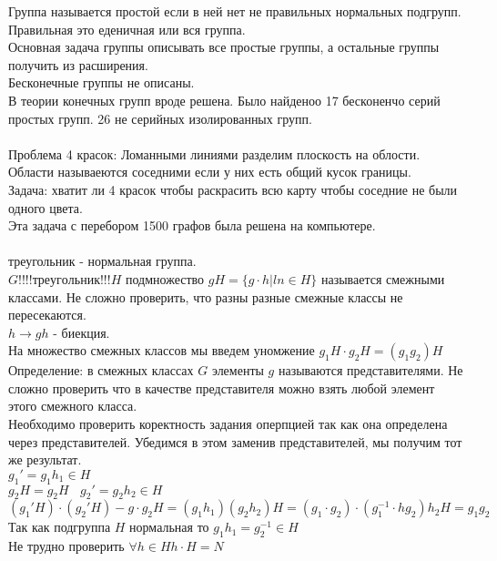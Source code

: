 Группа называется простой если в ней нет не правильных нормальных подгрупп.\\
Правильная это еденичная или вся группа.\\

Основная задача группы описывать все простые группы, а остальные группы получить
из расширения.\\

Бесконечные группы не описаны.\\

В теории конечных групп вроде решена. Было найденоо 17 бесконенчо серий простых
групп. 26 не серийных изолированных групп.\\\\

Проблема 4 красок: Ломанными линиями разделим плоскость на облости. Области
называеются соседними если у них есть общий кусок границы.\\
Задача: хватит ли 4 красок чтобы раскрасить всю карту чтобы соседние не были
одного цвета.\\
Эта задача с перебором 1500 графов была решена на компьютере.\\

\\
треугольник - нормальная группа.\\
$G 	!!!!треугольник!!! H$ подмножество $gH = \{g\cdot h | ln \in H\}$ называется
смежными классами. Не сложно проверить, что разны разные смежные классы не
пересекаются.\\
$h \to gh$ - биекция.\\
На множество смежных классов мы введем уномжение $g_1H\cdot g_2H = (g_1g_2)H$\\

Определение: в смежных классах $G$ элементы $g$ называются представителями. Не
сложно проверить что в качестве представителя можно взять любой элемент этого
смежного класса.\\
Необходимо проверить коректность задания оперпцией так как она определена через
представителей. Убедимся в этом заменив представителей, мы получим тот же
результат.\\
$g_1' = g_1 h_1 \in H$\\
$g_2 H = g_2 H ~~~~ g_2' = g_2 h_2 \in H$\\
$
  (g_1' H)\cdot(g_2' H) - g\cdot g_2 H = (g_1 h_1)(g_2 h_2)H =
  (g_1 \cdot g_2)\cdot(g_{1}^{-1} \cdot hg_2)h_2 H = g_1 g_2
$\\
Так как подгруппа $H$ нормальная то $g_1 h_1 = g_{2}^{-1} \in H$\\
Не трудно проверить $\forall h\in H h\cdot H = N$\\

